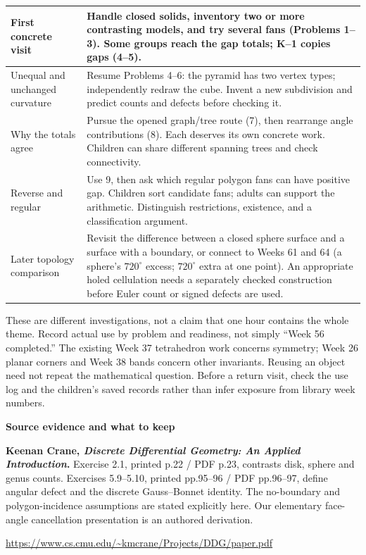 \documentclass[11pt,letterpaper]{article}
\newcommand{\titleline}[1]{\par{\Large\bfseries #1}\par\vspace{4pt}}
\newcommand{\sub}[1]{\par\vspace{3pt}{\bfseries #1}\par}
\newcommand{\degc}{^{\circ}}
\begin{document}
\sub{Several visits from this theme}
\begin{tabularx}{\linewidth}{|p{3.4cm}|Y|}\hline
First concrete visit & Handle closed solids, inventory two or more contrasting models, and try several fans (Problems 1--3). Some groups reach the gap totals; K--1 copies gaps (4--5).\\\hline
Unequal and unchanged curvature & Resume Problems 4--6: the pyramid has two vertex types; independently redraw the cube. Invent a new subdivision and predict counts and defects before checking it.\\\hline
Why the totals agree & Pursue the opened graph/tree route (7), then rearrange angle contributions (8). Each deserves its own concrete work. Children can share different spanning trees and check connectivity.\\\hline
Reverse and regular & Use 9, then ask which regular polygon fans can have positive gap. Children sort candidate fans; adults can support the arithmetic. Distinguish restrictions, existence, and a classification argument.\\\hline
Later topology comparison & Revisit the difference between a closed sphere surface and a surface with a boundary, or connect to Weeks 61 and 64 (a sphere's $720\degc$ excess; $720\degc$ extra at one point). An appropriate holed cellulation needs a separately checked construction before Euler count or signed defects are used.\\\hline
\end{tabularx}
These are different investigations, not a claim that one hour contains the whole theme. Record actual use by problem and readiness, not simply ``Week 56 completed.'' The existing Week 37 tetrahedron work concerns symmetry; Week 26 planar corners and Week 38 bands concern other invariants. Reusing an object need not repeat the mathematical question. Before a return visit, check the use log and the children's saved records rather than infer exposure from library week numbers.

\newpage
\titleline{Source evidence and what to keep}
\sub{Mathematical precedents}
\textbf{Keenan Crane, \emph{Discrete Differential Geometry: An Applied Introduction}.} Exercise 2.1, printed p.22 / PDF p.23, contrasts disk, sphere and genus counts. Exercises 5.9--5.10, printed pp.95--96 / PDF pp.96--97, define angular defect and the discrete Gauss--Bonnet identity. The no-boundary and polygon-incidence assumptions are stated explicitly here. Our elementary face-angle cancellation presentation is an authored derivation.\par
\url{https://www.cs.cmu.edu/~kmcrane/Projects/DDG/paper.pdf}
\end{document}
